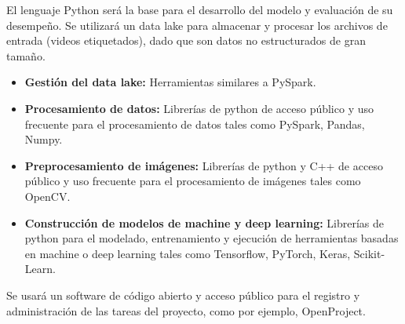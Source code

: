El lenguaje Python será la base para el desarrollo del modelo y evaluación de su desempeño. Se utilizará un data lake para almacenar y procesar los archivos de entrada (videos etiquetados), dado que son datos no estructurados de gran tamaño.
\begin{itemize}
	\item {\bf Gestión del data lake:} Herramientas similares a PySpark.
	\item {\bf Procesamiento de datos:} Librerías de python de acceso público y uso frecuente para el procesamiento de datos tales como PySpark, Pandas, Numpy.
	\item {\bf Preprocesamiento de imágenes:} Librerías de python y C++ de acceso público y uso frecuente para el procesamiento de imágenes tales como OpenCV.
	\item {\bf Construcción de modelos de machine y deep learning:} Librerías de python para el modelado, entrenamiento y ejecución de herramientas basadas en machine o deep learning tales como Tensorflow, PyTorch, Keras, Scikit-Learn.
\end{itemize}

Se usará un software de código abierto y acceso público para el registro y administración de las tareas del proyecto, como por ejemplo, OpenProject.
